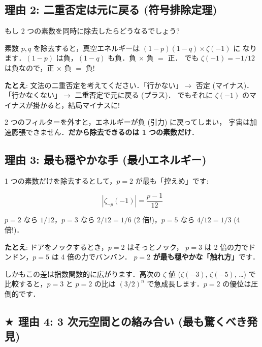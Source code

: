 \documentclass[11pt,a4paper]{article}
\begin{document}
\subsection{理由 2: 二重否定は元に戻る (符号排除定理)}

もし 2 つの素数を同時に除去したらどうなるでしょう?

素数 $p, q$ を除去すると，真空エネルギーは $(1-p)(1-q) \times \zeta(-1)$ に
なります．$(1-p)$ は負，$(1-q)$ も負．負 $\times$ 負 $=$ 正．
でも $\zeta(-1) = -1/12$ は負なので，正 $\times$ 負 $=$ 負!

\begin{tcolorbox}[colback=yellow!5,colframe=orange!60!black]
\textbf{たとえ}: 文法の二重否定を考えてください．「行かない」$\to$ 否定
(マイナス)．「行かなくない」$\to$ 二重否定で元に戻る (プラス)．
でもそれに $\zeta(-1)$ のマイナスが掛かると，結局マイナスに!

2 つのフィルターを外すと，エネルギーが負 (引力) に戻ってしまい，
宇宙は加速膨張できません．\textbf{だから除去できるのは 1 つの素数だけ}．
\end{tcolorbox}

\subsection{理由 3: 最も穏やかな手 (最小エネルギー)}

1 つの素数だけを除去するとして，$p = 2$ が最も「控えめ」です:

\begin{equation*}
|\zeta_{\neg p}(-1)| = \frac{p-1}{12}
\end{equation*}

$p = 2$ なら $1/12$，$p = 3$ なら $2/12 = 1/6$ (2 倍!)，$p = 5$ なら $4/12 = 1/3$ (4 倍!)．

\begin{tcolorbox}[colback=blue!5,colframe=blue!50!black]
\textbf{たとえ}: ドアをノックするとき，$p = 2$ はそっとノック，
$p = 3$ は 2 倍の力でドンドン，$p = 5$ は 4 倍の力でバンバン．
\textbf{$p = 2$ が最も穏やかな「触れ方」}です．

しかもこの差は指数関数的に広がります．高次の $\zeta$ 値 ($\zeta(-3)$,
$\zeta(-5)$, \ldots) で比較すると，$p = 3$ と $p = 2$ の比は
$(3/2)^n$ で急成長します．$p = 2$ の優位は圧倒的です．
\end{tcolorbox}

\subsection{$\bigstar$ 理由 4: 3 次元空間との絡み合い (最も驚くべき発見)}
\end{document}
